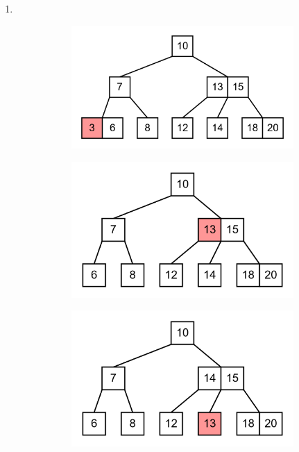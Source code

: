 \documentclass[11pt,a4paper]{article}
\begin{document}
\begin{loesung}
\begin{enumerate}
        \newpage
        \item \ \\
        \begin{figure}[h!]
            \centering
            \begin{subfigure}[b]{0.31\textwidth}
                \centering
                \includegraphics[scale=0.15]{img/3e/2}
            \end{subfigure}
            \begin{subfigure}[b]{0.31\textwidth}
                \centering
                \includegraphics[scale=0.15]{img/3e/3}
            \end{subfigure}
            \begin{subfigure}[b]{0.31\textwidth}
                \centering
                \includegraphics[scale=0.15]{img/3e/4}

\end{subfigure}
\end{figure}
\end{enumerate}
\end{loesung}
\end{document}
